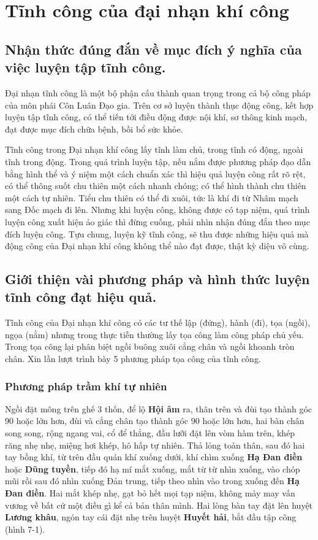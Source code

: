 \section{Tĩnh công của đại nhạn khí công}

\subsection{Nhận thức đúng đắn về mục đích ý nghĩa của việc luyện tập tĩnh công.}

Đại nhạn tĩnh công là một bộ phận cấu thành quan trọng trong cả bộ công pháp của môn phái Côn Luân Đạo gia. Trên cơ sở luyện thành thục động công, kết hợp luyện tập tĩnh công, có thể tiến tới điều động được nội khí, sơ thông kinh mạch, đạt được mục đích chữa bệnh, bồi bổ sức khỏe.

Tĩnh công trong Đại nhạn khí công lấy tĩnh làm chủ, trong tĩnh có động, ngoài tĩnh trong động. Trong quá trình luyện tập, nếu nắm được phương pháp đạo dẫn bằng hình thể và ý niệm một cách chuẩn xác thì hiệu quả luyện công rất rõ rệt, có thể thông suốt chu thiên một cách nhanh chóng; có thể hình thành chu thiên một cách tự nhiên. Tiểu chu thiên có thể đi xuôi, tức là khí đi từ Nhâm mạch sang Đốc mạch đi lên. Nhưng khi luyện công, không được có tạp niệm, quá trình luyện công xuất hiện ảo giác thì đừng cuống, phải nhìn nhận đúng đắn theo mục đích luyện công. Tựu chung, luyện kỹ tĩnh công, sẽ thu được những hiệu quả mà động công của Đại nhạn khí công không thể nào đạt được, thật kỳ diệu vô cùng.


\subsection{Giới thiện vài phương pháp và hình thức luyện tĩnh công đạt hiệu quả.}

Tĩnh công của Đại nhạn khí công có các tư thế lập (đứng), hành (đi), tọa (ngồi), ngọa (nằm) nhưng trong thực tiễn thường lấy tọa công làm công pháp chủ yếu. Trong tọa công lại phân biệt ngồi buông xuôi cẳng chân và ngồi khoanh tròn chân. Xin lần lượt trình bày 5 phương pháp tọa công của tĩnh công.

\subsubsection{Phương pháp trầm khí tự nhiên}

Ngồi đặt mông trên ghế 3 thốn, để lộ \textbf{Hội âm} ra,
thân trên và đùi tạo thành góc 90 hoặc lớn hơn,
đùi và cẳng chân tạo thành góc 90 hoặc lớn hơn,
hai bàn chân song song, rộng ngang vai, cổ để thẳng,
đầu lưỡi đặt lên vòm hàm trên, khép răng nhẹ nhẹ,
miệng hơi khép, hô hấp tự nhiên. Thả lỏng toàn thân,
sau đó hai tay bồng khí, từ trên đầu quán khí xuống dưới,
khí chìm xuống \textbf{Hạ Đan điền} hoặc \textbf{Dũng tuyền},
tiếp đó hạ mí mắt xuống, mắt từ từ nhìn xuống, vào chóp mũi
rồi sau đó nhìn xuống Đản trung, tiếp theo nhìn vào 
trong xuống đến \textbf{Hạ Đan điền}. Hai mắt khép nhẹ,
gạt bỏ hết mọi tạp niệm, không mảy may vấn vương về bất
cứ một điều gì kể cả bản thân mình. Hai lòng bàn tay đặt
lên huyệt \textbf{Lương khâu}, ngón tay cái đặt nhẹ trên
huyệt \textbf{Huyết hải}, bắt đầu tập công (hình 7-1).

